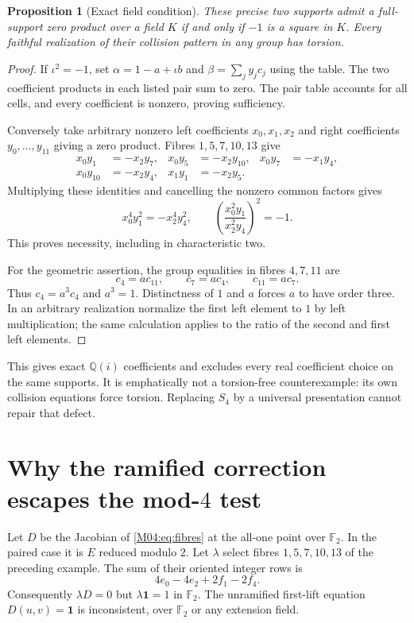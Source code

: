 \documentclass[11pt,a4paper,oneside]{report}
\newtheorem{proposition}[theorem]{Proposition}
\theoremstyle{definition}
\theoremstyle{remark}
\newcommand{\Q}{\mathbb Q}
\newcommand{\F}{\mathbb F}
\newcommand{\one}{\mathbf 1}
\begin{document}
\begin{proposition}[Exact field condition]\label{M04:prop:s4}
These precise two supports admit a full-support zero product over a
field $K$ if and only if $-1$ is a square in $K$. Every faithful
realization of their collision pattern in any group has torsion.
\end{proposition}
\begin{proof}
If $\iota^2=-1$, set $\alpha=1-a+\iota b$ and
$\beta=\sum_jy_jc_j$ using the table. The two coefficient products in
each listed pair sum to zero. The pair table accounts for all cells,
and every coefficient is nonzero, proving sufficiency.

Conversely take arbitrary nonzero left coefficients $x_0,x_1,x_2$
and right coefficients $y_0,\ldots,y_{11}$ giving a zero product.
Fibres $1,5,7,10,13$ give
\begin{align*}
x_0y_1&=-x_2y_7,&x_0y_5&=-x_2y_{10},&x_0y_7&=-x_1y_4,\\
x_0y_{10}&=-x_2y_4,&x_1y_1&=-x_2y_5.
\end{align*}
Multiplying these identities and cancelling the nonzero common
factors gives
\[
x_0^4y_1^2=-x_2^4y_4^2,
\qquad \left(\frac{x_0^2y_1}{x_2^2y_4}\right)^2=-1.
\]
This proves necessity, including in characteristic two.

For the geometric assertion, the group equalities in fibres $4,7,11$
are
\[
c_4=ac_{11},\qquad c_7=ac_4,\qquad c_{11}=ac_7.
\]
Thus $c_4=a^3c_4$ and $a^3=1$. Distinctness of $1$ and $a$ forces
$a$ to have order three. In an arbitrary realization normalize the
first left element to $1$ by left multiplication; the same calculation
applies to the ratio of the second and first left elements.
\end{proof}

This gives exact $\Q(i)$ coefficients and excludes every real
coefficient choice on the same supports. It is emphatically not a
torsion-free counterexample: its own collision equations force torsion.
Replacing $S_4$ by a universal presentation cannot repair that defect.

\section{Why the ramified correction escapes the mod-\texorpdfstring{$4$}{4} test}

Let $D$ be the Jacobian of \eqref{M04:eq:fibres} at the all-one point over
$\F_2$. In the paired case it is $E$ reduced modulo $2$.
Let $\lambda$ select fibres $1,5,7,10,13$ of the preceding example.
The sum of their oriented integer rows is
\[
4e_0-4e_2+2f_1-2f_4.
\]
Consequently $\lambda D=0$ but $\lambda\one=1$ in $\F_2$.
The unramified first-lift equation $D(u,v)=\one$ is inconsistent,
over $\F_2$ or any extension field.
\end{document}
